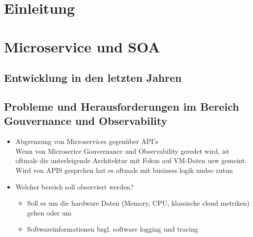 \documentclass[
	12pt,
	BCOR=5mm,
	DIV=12,
	headinclude=on,
	footinclude=off,
	parskip=half,
	bibliography=totoc,
	listof=entryprefix,
	toc=listof,
	numbers=noenddot,
	plainfootsepline
]{scrreprt}
\begin{document}



\normalfont



\tableofcontents

\listoffigures

\listoftables



\clearpage
\ihead{\chaptername~\thechapter}
\ohead{\headmark}

\chapter{Einleitung}
\chapter{Microservice und SOA}
\section{Entwicklung in den letzten Jahren}
\section{Probleme und Herausforderungen im Bereich Gouvernance und Observability}
\begin{itemize}
	\item Abgrenzung von Microservices gegenüber API's \\
	Wenn von Microserice Gouvernance und Observability geredet wird, ist oftmals die unterleigende Architektur mit Fokus auf VM-Daten usw gemeint. Wird von APIS gesprchen hat es oftmals mit business logik undso zutun
\end{itemize}
\begin{itemize}
	\item Welcher bereich soll observiert werden?
	\begin{itemize}
		\item Soll es um die hardware Daten (Memory, CPU, klassische cloud metriken) gehen oder um
		\item Softwareinformationen bzgl. software logging und tracing
	\end{itemize}
\end{itemize}
\end{document}
